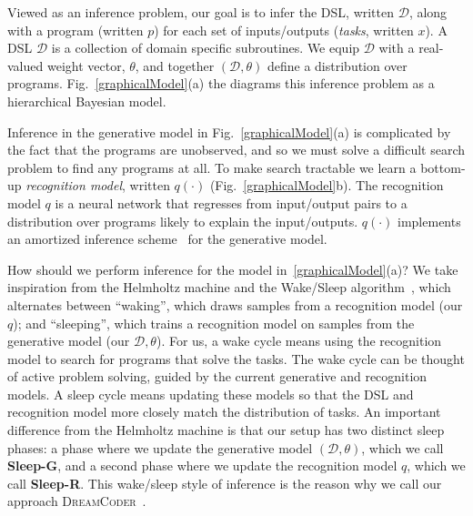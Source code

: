 \documentclass{article}
\newcommand{\system}{\textsc{DreamCoder}~}
\begin{document}
Viewed as an inference problem,
our goal is to infer the DSL, written $\mathcal{D}$,
along with a program (written $p$) for each set of inputs/outputs (\emph{tasks}, written $x$).
A DSL $\mathcal{D}$ is a collection of domain specific subroutines.
We equip $\mathcal{D}$ with a real-valued weight vector, $\theta$, and together
$(\mathcal{D},\theta)$ define a distribution over programs.
Fig.~\ref{graphicalModel}(a) the diagrams this inference problem as a hierarchical Bayesian model.




Inference in the generative model in Fig.~\ref{graphicalModel}(a) is
complicated by the fact that the programs are unobserved,
and so we must solve a difficult search problem to find any programs at all. To make
search tractable we learn a bottom-up \emph{recognition
  model}, written $q(\cdot )$
(Fig.~\ref{graphicalModel}b).  The recognition model $q$ is a neural
network that regresses from input/output pairs to a distribution over
programs likely to explain the input/outputs. $q(\cdot )$ implements an amortized
inference
scheme~\cite{le2016inference} for the generative %
model.

How should we perform inference for the model
in~\ref{graphicalModel}(a)?
We take inspiration from the Helmholtz machine and the Wake/Sleep algorithm~\cite{hinton1995wake},
which alternates between ``waking'', which draws samples from a recognition model (our $q$);
and  ``sleeping'', which trains a recognition model on samples from the generative model (our $\mathcal{D},\theta$).
For us, a wake cycle means using the recognition model to search for programs that solve the tasks.
The wake cycle can be thought of active problem solving,
guided by the current generative and recognition models.
A sleep cycle means  updating these models so that the DSL and  recognition model
more closely match the distribution of tasks.
An important difference from the Helmholtz machine
is that our setup has two distinct sleep phases: a phase where we update the generative model
$(\mathcal{D},\theta)$, which we call \textbf{Sleep-G},
and a second phase where we update the recognition model $q$,
which we call \textbf{Sleep-R}.
This wake/sleep style of inference is the reason why we call our approach \system.
\end{document}
